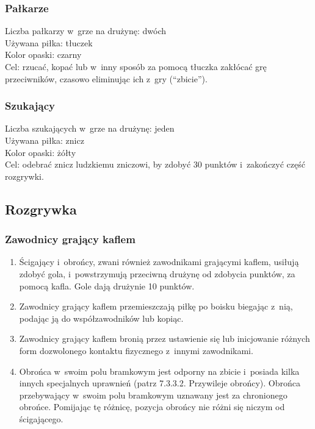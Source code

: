 \documentclass[12pt]{article}
\begin{document}
\subsubsection{Pałkarze}
Liczba pałkarzy w~grze na drużynę: dwóch \\
Używana piłka: tłuczek \\
Kolor opaski: czarny \\
Cel: rzucać, kopać lub w~inny sposób za pomocą tłuczka zakłócać grę
przeciwników, czasowo eliminując ich z~gry (``zbicie'').

\subsubsection{Szukający}
Liczba szukających w~grze na drużynę: jeden \\
Używana piłka: znicz \\
Kolor opaski: żółty \\
Cel: odebrać znicz ludzkiemu zniczowi, by zdobyć 30 punktów i~zakończyć
część rozgrywki.

\subsection{Rozgrywka}

\subsubsection{Zawodnicy grający kaflem}
\begin{enumerate}
	\item Ścigający i~obrońcy, zwani również zawodnikami grającymi kaflem,
	      usiłują zdobyć gola, i~powstrzymują przeciwną drużynę od zdobycia
	      punktów, za pomocą kafla. Gole dają drużynie 10 punktów.

	\item Zawodnicy grający kaflem przemieszczają piłkę po boisku biegając z~nią, podając ją do współzawodników lub kopiąc.

	\item Zawodnicy grający kaflem bronią przez ustawienie się lub inicjowanie
	      różnych form dozwolonego kontaktu fizycznego z~innymi zawodnikami.

	\item Obrońca w~swoim polu bramkowym jest odporny na zbicie i~posiada kilka
	      innych specjalnych uprawnień (patrz 7.3.3.2. Przywileje obrońcy).
	      Obrońca przebywający w~swoim polu bramkowym uznawany jest za chronionego
	      obrońce. Pomijając tę różnicę, pozycja obrońcy nie różni się niczym od
	      ścigającego.
\end{enumerate}
\end{document}
